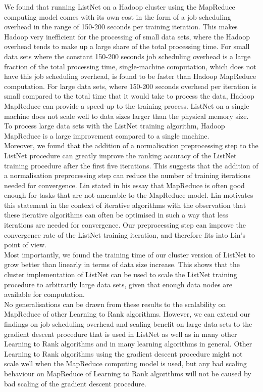 We found that running ListNet on a Hadoop cluster using the MapReduce computing model comes with its own cost in the form of a job scheduling overhead in the range of 150-200 seconds per training iteration. This makes Hadoop very inefficient for the processing of small data sets, where the Hadoop overhead tends to make up a large share of the total processing time. For small data sets where the constant 150-200 seconds job scheduling overhead is a large fraction of the total processing time, single-machine computation, which does not have this job scheduling overhead, is found to be faster than Hadoop MapReduce computation. For large data sets, where 150-200 seconds overhead per iteration is small compared to the total time that it would take to process the data, Hadoop MapReduce can provide a speed-up to the training process. ListNet on a single machine does not scale well to data sizes larger than the physical memory size. To process large data sets with the ListNet training algorithm, Hadoop MapReduce is a large improvement compared to a single machine.\\

Moreover, we found that the addition of a normalisation preprocessing step to the ListNet procedure can greatly improve the ranking accuracy of the ListNet training procedure after the first five iterations. This suggests that the addition of a normalisation preprocessing step can reduce the number of training iterations needed for convergence. Lin stated in his essay \cite{Lin2013} that MapReduce is often good enough for tasks that are not-amenable to the MapReduce model. Lin motivates this statement in the context of iterative algorithms with the observation that these iterative algorithms can often be optimised in such a way that less iterations are needed for convergence. Our preprocessing step can improve the convergence rate of the ListNet training iteration, and therefore fits into Lin's point of view.\\

Most importantly, we found the training time of our cluster version of ListNet to grow better than linearly in terms of data size increase. This shows that the cluster implementation of ListNet can be used to scale the ListNet training procedure to arbitrarily large data sets, given that enough data nodes are available for computation.\\

No generalisations can be drawn from these results to the scalability on MapReduce of other Learning to Rank algorithms. However, we can extend our findings on job scheduling overhead and scaling benefit on large data sets to the gradient descent procedure that is used in ListNet as well as in many other Learning to Rank algorithms and in many learning algorithms in general. Other Learning to Rank algorithms using the gradient descent procedure might not scale well when the MapReduce computing model is used, but any bad scaling behaviour on MapReduce of Learning to Rank algorithms will not be caused by bad scaling of the gradient descent procedure.

